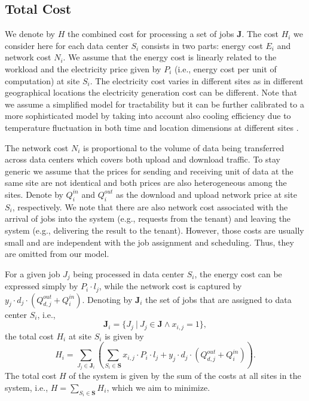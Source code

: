 \documentclass{article}
\begin{document}
\subsection{Total Cost}

We denote by $H$ the combined cost for processing a set of jobs $\mathbf{J}$. The cost $H_i$ we consider here for each data center $S_i$ consists in two parts: energy cost $E_i$ and network cost $N_i$. We assume that the energy cost is linearly related to the workload and the electricity price given by $P_i$ (i.e., energy cost per unit of computation) at site $S_i$. The electricity cost varies in different sites as in different geographical locations the electricity generation cost can be different. Note that we assume a simplified model for tractability but it can be further calibrated to a more sophisticated model by taking into account also cooling efficiency due to temperature fluctuation in both time and location dimensions at different sites \cite{Xu-TPDS-2015}.

The network cost $N_i$ is proportional to the volume of data being transferred across data centers which covers both upload and download traffic. To stay generic we assume that the prices for sending and receiving unit of data at the same site are not identical and both prices are also heterogeneous among the sites. Denote by $Q_i^{in}$ and $Q_i^{out}$ as the download and upload network price at site $S_i$, respectively. We note that there are also network cost associated with the arrival of jobs into the system (e.g., requests from the tenant) and leaving the system (e.g., delivering the result to the tenant). However, those costs are usually small and are independent with the job assignment and scheduling. Thus, they are omitted from our model.

For a given job $J_j$ being processed in data center $S_i$, the energy cost can be expressed simply by $P_i \cdot l_j$, while the network cost is captured by $y_j \cdot d_j \cdot (Q_{d,j}^{out} + Q_i^{in})$. Denoting by $\mathbf{J}_i$ the set of jobs that are assigned to data center $S_i$, i.e.,
\begin{equation}
\mathbf{J}_i = \{ J_j~|~J_j \in \mathbf{J} \wedge x_{i,j} = 1 \},
\end{equation}
the total cost $H_i$ at site $S_i$ is given by
\begin{equation}
H_i = \sum_{J_j \in \mathbf{J}_i} \left( \sum_{S_i \in \mathbf{S}} x_{i,j} \cdot P_i \cdot l_j + y_j \cdot d_j \cdot (Q_{d,j}^{out} + Q_i^{in}) \right).
\end{equation}
The total cost $H$ of the system is given by the sum of the costs at all sites in the system, i.e., $H = \sum_{S_i \in \mathbf{S}} H_i$, which we aim to minimize.
\end{document}
